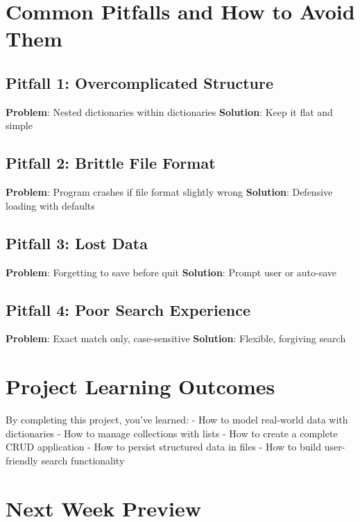 \documentclass[
  letterpaper,
  DIV=11,
  numbers=noendperiod,
  oneside]{scrreprt}
\begin{document}
\section{Common Pitfalls and How to Avoid
Them}\label{common-pitfalls-and-how-to-avoid-them-5}

\subsection{Pitfall 1: Overcomplicated
Structure}\label{pitfall-1-overcomplicated-structure}

\textbf{Problem}: Nested dictionaries within dictionaries
\textbf{Solution}: Keep it flat and simple

\subsection{Pitfall 2: Brittle File
Format}\label{pitfall-2-brittle-file-format}

\textbf{Problem}: Program crashes if file format slightly wrong
\textbf{Solution}: Defensive loading with defaults

\subsection{Pitfall 3: Lost Data}\label{pitfall-3-lost-data}

\textbf{Problem}: Forgetting to save before quit \textbf{Solution}:
Prompt user or auto-save

\subsection{Pitfall 4: Poor Search
Experience}\label{pitfall-4-poor-search-experience}

\textbf{Problem}: Exact match only, case-sensitive \textbf{Solution}:
Flexible, forgiving search

\section{Project Learning Outcomes}\label{project-learning-outcomes-5}

By completing this project, you've learned: - How to model real-world
data with dictionaries - How to manage collections with lists - How to
create a complete CRUD application - How to persist structured data in
files - How to build user-friendly search functionality

\section{Next Week Preview}\label{next-week-preview-4}
\end{document}
